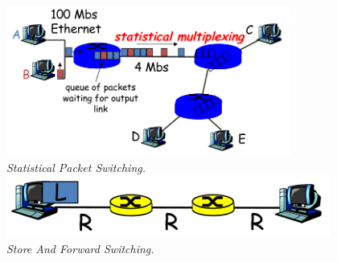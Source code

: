 \documentclass{scrartcl}
\begin{document}
\begin{enumerate}[$\bullet$]
\begin{center}
        \includegraphics[width=0.7\textwidth]{PacketSwitchingStatistical.png}\\
        \textit{Statistical Packet Switching.}\\
        
        \includegraphics[width=0.8\textwidth]{PacketSwitchingSF.png}\\
        \textit{Store And Forward Switching.}\\
    \end{center}
                

\end{enumerate}
\end{document}
